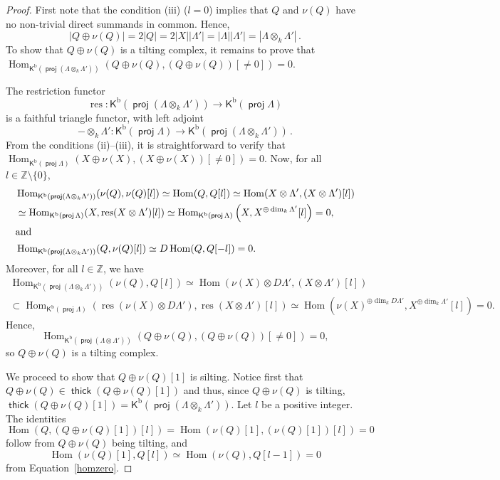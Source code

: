 \documentclass[a4paper,reqno,11pt]{amsart}
\theoremstyle{definition}
\newcommand{\KKK}{\mathsf{K}}
\newcommand{\Z}{\mathbb{Z}}
\newcommand{\bo}{\operatorname{b}\nolimits}
\newcommand{\Hom}{\operatorname{Hom}\nolimits}
\DeclareMathOperator{\proj}{\mathsf{proj}}
\DeclareMathOperator{\thick}{\mathsf{thick}}
\DeclareMathOperator{\res}{res}
\newcommand{\old}[1]{{\red #1}}
\numberwithin{equation}{section}
\begin{document}
\old{
\begin{proof}
  First note that the condition (iii) ($l=0$) implies that $Q$ and $\nu(Q)$ have no non-trivial direct summands in common. Hence,
  \[|Q\oplus\nu(Q)| = 2|Q| = 2|X||\Lambda'| = |\Lambda||\Lambda'| = |\Lambda\otimes_k\Lambda'| \,.\]
  To show that $Q\oplus\nu(Q)$ is a tilting complex, it remains to prove that
  $\Hom_{\KKK^{\bo}(\proj\left(\Lambda\otimes_k\Lambda'\right))} (Q\oplus\nu(Q),(Q\oplus\nu(Q))[\ne0]) = 0$.

The restriction functor
\[\res : \KKK^{\bo}(\proj\left(\Lambda\otimes_k\Lambda'\right)) \to \KKK^{\bo}(\proj\Lambda) \]
is a faithful triangle functor, with left adjoint
%
\[-\otimes_k\Lambda': \KKK^{\bo}(\proj\Lambda) \to \KKK^{\bo}(\proj(\Lambda\otimes_k\Lambda'))\, . \]
%
From the conditions (ii)--(iii), it is straightforward to verify that $\Hom_{\KKK^{\bo}(\proj\Lambda)}(X\oplus\nu(X),(X\oplus\nu(X))[\ne0])=0$. 
Now, for all $l\in\Z\setminus\{0\}$,
\begin{align*}
  &\Hom_{\KKK^{\bo}(\proj\left(\Lambda\otimes_k\Lambda'\right))}(\nu(Q),\nu(Q)[l]) \simeq
  \Hom(Q,Q[l]) \simeq
  \Hom(X\otimes\Lambda',(X\otimes\Lambda')[l]) \\
  &\simeq \Hom_{\KKK^{\bo}(\proj\Lambda)} (X, \res(X\otimes\Lambda')[l]) \simeq \Hom_{\KKK^{\bo}(\proj\Lambda)} \left(X, X^{\oplus\dim_k\Lambda'}[l]\right) = 0,\\
  \intertext{and}
  &\Hom_{\KKK^{\bo}(\proj\left(\Lambda\otimes_k\Lambda'\right))}(Q,\nu(Q)[l]) \simeq
  D\Hom(Q,Q[-l]) = 0.
\end{align*}
%
Moreover, for all $l\in\Z$, we have
\begin{multline}\label{homzero}
  \Hom_{\KKK^{\bo}(\proj\left(\Lambda\otimes_k\Lambda'\right))}(\nu(Q),Q[l]) \simeq
  \Hom(\nu(X)\otimes D\Lambda', (X\otimes \Lambda')[l]) \\
  \subset
  \Hom_{\KKK^{\bo}(\proj\Lambda)} (\res(\nu(X)\otimes D\Lambda') , \res(X\otimes\Lambda')[l]) \simeq
  \Hom(\nu(X)^{\oplus\dim_kD\Lambda'}, X^{\oplus\dim_k\Lambda'}[l]) = 0 .
\end{multline}
%
Hence, \[\Hom_{\KKK^{\bo}(\proj(\Lambda\otimes\Lambda'))}(Q\oplus\nu(Q),(Q\oplus\nu(Q))[\ne0])=0,\]
so $Q\oplus\nu(Q)$ is a tilting complex. 

We proceed to show that $Q\oplus\nu(Q)[1]$ is silting.
Notice first that $Q\oplus\nu(Q)\in\thick(Q\oplus\nu(Q)[1])$ and thus, since $Q\oplus\nu(Q)$ is tilting,
$\thick(Q\oplus\nu(Q)[1]) = \KKK^{\bo}(\proj\left(\Lambda\otimes_k\Lambda'\right))$. 
Let $l$ be a positive integer. The identities
\[\Hom(Q,(Q\oplus\nu(Q)[1])[l]) = \Hom(\nu(Q)[1],(\nu(Q)[1])[l]) = 0 \]
follow from $Q\oplus\nu(Q)$ being tilting, and
\[\Hom(\nu(Q)[1],Q[l])\simeq \Hom(\nu(Q),Q[l-1]) = 0\]
from Equation~\eqref{homzero}.
%
\end{proof}
}
\end{document}
